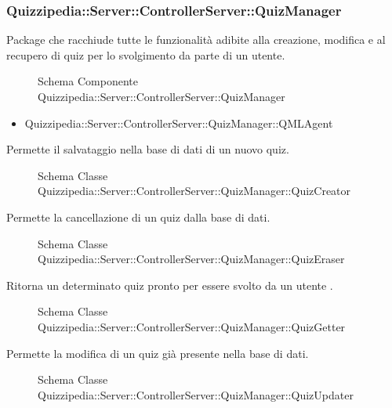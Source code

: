 \subsubsection{Quizzipedia::Server::ControllerServer::QuizManager}
Package che racchiude tutte le funzionalità adibite alla creazione, modifica e al recupero di quiz per lo svolgimento da parte di un utente.
\begin{figure}[H]
\centering
\noindent{}
\caption{Schema Componente Quizzipedia::Server::ControllerServer::QuizManager}
\end{figure}
\begin{itemize}
\item Quizzipedia::Server::ControllerServer::QuizManager::QMLAgent
\end{itemize}
Permette il salvataggio nella base di dati di un nuovo quiz.
\begin{figure}[H]
\centering
\noindent{}
\caption{Schema Classe Quizzipedia::Server::ControllerServer::QuizManager::QuizCreator}
\end{figure}
Permette la cancellazione di un quiz dalla base di dati.
\begin{figure}[H]
\centering
\noindent{}
\caption{Schema Classe Quizzipedia::Server::ControllerServer::QuizManager::QuizEraser}
\end{figure}
Ritorna un determinato quiz pronto per essere svolto da un utente .
\begin{figure}[H]
\centering
\noindent{}
\caption{Schema Classe Quizzipedia::Server::ControllerServer::QuizManager::QuizGetter}
\end{figure}
Permette la modifica di un quiz già presente nella base di dati.
\begin{figure}[H]
\centering
\noindent{}
\caption{Schema Classe Quizzipedia::Server::ControllerServer::QuizManager::QuizUpdater}
\end{figure}
